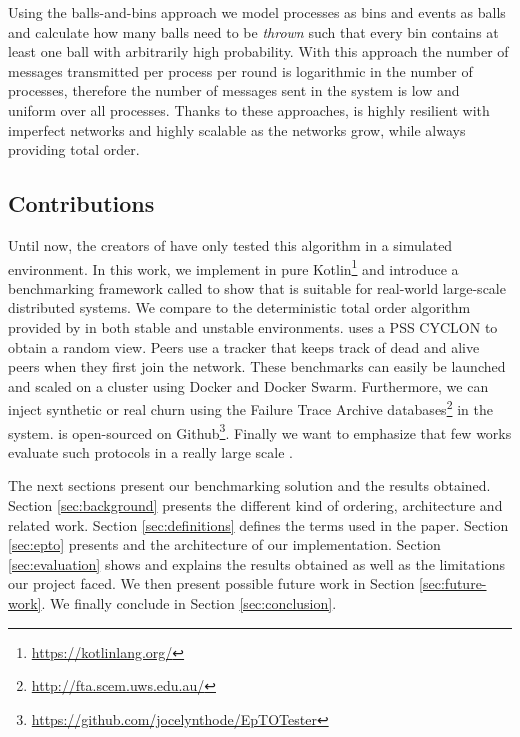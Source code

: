 \par
Using the balls-and-bins approach we model processes as bins and events as balls and calculate how many balls need to be \textit{thrown} such that every bin contains at least one ball with arbitrarily high probability. With this approach the number of messages transmitted per process per round is logarithmic in the number of processes, therefore the number of messages sent in the system is low and uniform over all processes. Thanks to these approaches, \epto is highly resilient with  imperfect networks and highly scalable as the networks grow, while always providing total order.
\subsection{Contributions}
Until now, the creators of \epto have only tested this algorithm in a simulated environment. In this work, we implement \epto in pure Kotlin\footnote{\href{https://kotlinlang.org/}{https://kotlinlang.org/}} and introduce a benchmarking framework called \eptotester to show that \epto is suitable for real-world large-scale distributed systems. We compare \epto to the deterministic total order algorithm provided by \jgroups \autocite{jgroups} in both stable and unstable environments. \epto uses a PSS CYCLON \autocite{Voulgaris2005} to obtain a random view. Peers use a tracker that keeps track of dead and alive peers when they first join the network. These benchmarks can easily be launched and scaled on a cluster using Docker and Docker Swarm. Furthermore, we can inject synthetic or real churn using the Failure Trace Archive databases\footnote{\href{http://fta.scem.uws.edu.au/}{http://fta.scem.uws.edu.au/}} in the system. \eptotester is open-sourced on Github\footnote{\href{https://github.com/jocelynthode/EpTOTester}{https://github.com/jocelynthode/EpTOTester}}. Finally we want to emphasize that few works evaluate such protocols in a really large scale \autocites[]{Chandra2007}[]{Maia2011}.
\par
The next sections present our benchmarking solution and the results obtained. Section \ref{sec:background} presents the different kind of ordering, \epto architecture and related work. Section \ref{sec:definitions} defines the terms used in the paper. Section \ref{sec:epto} presents \epto and the architecture of our implementation. Section \ref{sec:evaluation} shows and explains the results obtained as well as the limitations our project faced. We then present possible future work in Section \ref{sec:future-work}. We finally conclude in Section \ref{sec:conclusion}.
